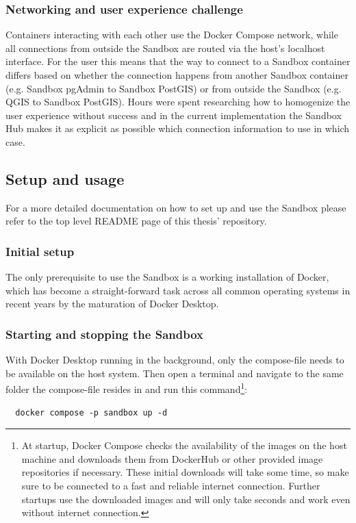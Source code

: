 \documentclass[11pt, a4paper, oneside, parskip=full-]{scrartcl}
\begin{document}
\subsubsection*{Networking and user experience challenge}
Containers interacting with each other use the Docker Compose network, while all
connections from outside the Sandbox are routed via the host's localhost
interface. For the user this means that the way to connect to a Sandbox
container differs based on whether the connection happens from another Sandbox
container (e.g. Sandbox pgAdmin to Sandbox PostGIS) or from outside the Sandbox
(e.g. QGIS to Sandbox PostGIS). Hours were spent researching how to homogenize
the user experience without success and in the current implementation the
Sandbox Hub makes it as explicit as possible which connection information to use
in which case.


\subsection{Setup and usage}
For a more detailed documentation on how to set up and use the Sandbox please
refer to the top level README page of this thesis'
repository\cite{osgissandbox}.

\subsubsection*{Initial setup}
The only prerequisite to use the Sandbox is a working installation of Docker,
which has become a straight-forward task across all common operating systems in
recent years by the maturation of Docker Desktop\cite{dockerdesktop}.

\subsubsection*{Starting and stopping the Sandbox}
With Docker Desktop running in the background, only the
compose-file\cite{sandboxcomposefile} needs to be available on the host system.
Then open a terminal and navigate to the same folder the compose-file resides in
and run this command\footnote{At startup, Docker Compose checks the availability
of the images on the host machine and downloads them from DockerHub or other
provided image repositories if necessary. These initial downloads will take some
time, so make sure to be connected to a fast and reliable internet connection.
Further startups use the downloaded images and will only take seconds and work
even without internet connection.}:
\begin{lstlisting}
  docker compose -p sandbox up -d
\end{lstlisting}
\end{document}
